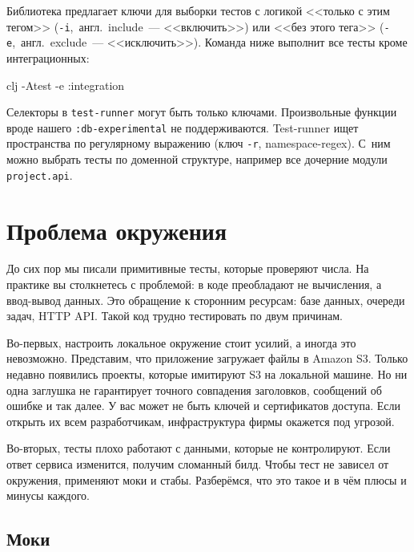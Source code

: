 Библиотека предлагает ключи для выборки тестов с логикой <<только с этим тегом>>
(\verb|-i|,~англ.~include~--- <<включить>>) или <<без этого тега>>
(\verb|-e|,~англ.~exclude~--- <<исключить>>). Команда ниже выполнит все тесты кроме
интеграционных:

\begin{english}
  \begin{bash}
clj -Atest -e :integration
  \end{bash}
\end{english}

Селекторы в \verb|test-runner| могут быть только ключами. Произвольные функции
вроде нашего \verb|:db-experimental| не поддерживаются. Test-runner ищет
пространства по регулярному выражению (ключ \verb|-r|, namespace-regex). С~ним
можно выбрать тесты по доменной структуре, например все дочерние модули
\verb|project.api|.

\section{Проблема окружения}


До сих пор мы писали примитивные тесты, которые проверяют числа. На практике вы
столкнетесь с проблемой: в коде преобладают не вычисления, а ввод-вывод
данных. Это обращение к сторонним ресурсам: базе данных, очереди задач, HTTP
API. Такой код трудно тестировать по двум причинам.


Во-первых, настроить локальное окружение стоит усилий, а иногда это
невозможно. Представим, что приложение загружает файлы в Amazon S3. Только
недавно появились проекты, которые имитируют S3 на локальной машине. Но ни одна
заглушка не гарантирует точного совпадения заголовков, сообщений об ошибке и так
далее. У вас может не быть ключей и сертификатов доступа. Если открыть их всем
разработчикам, инфраструктура фирмы окажется под угрозой.

Во-вторых, тесты плохо работают с данными, которые не контролируют. Если ответ
сервиса изменится, получим сломанный билд. Чтобы тест не зависел от окружения,
применяют моки и стабы. Разберёмся, что это такое и в чём плюсы и минусы
каждого.

\subsection{Моки}

